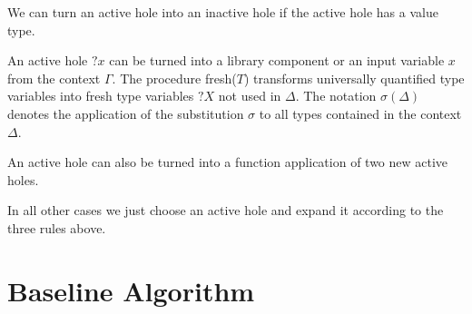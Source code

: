 We can turn an active hole into an inactive hole if the active hole has a value type.
\begin{prooftree}
\end{prooftree}

An active hole $?x$ can be turned into a library component or an input variable $x$ from the context $\Gamma$. The procedure fresh($T$) transforms universally quantified type variables into fresh type variables $?X$ not used in $\Delta$.
The notation $\sigma(\Delta)$ denotes the application of the substitution $\sigma$ to all types contained in the context $\Delta$.
\begin{prooftree}
\end{prooftree}

An active hole can also be turned into a function application of two new active holes.
\begin{prooftree}
\end{prooftree}

In all other cases we just choose an active hole and expand it according to the three rules above.
\begin{prooftree}
\end{prooftree}

\section{Baseline Algorithm}

